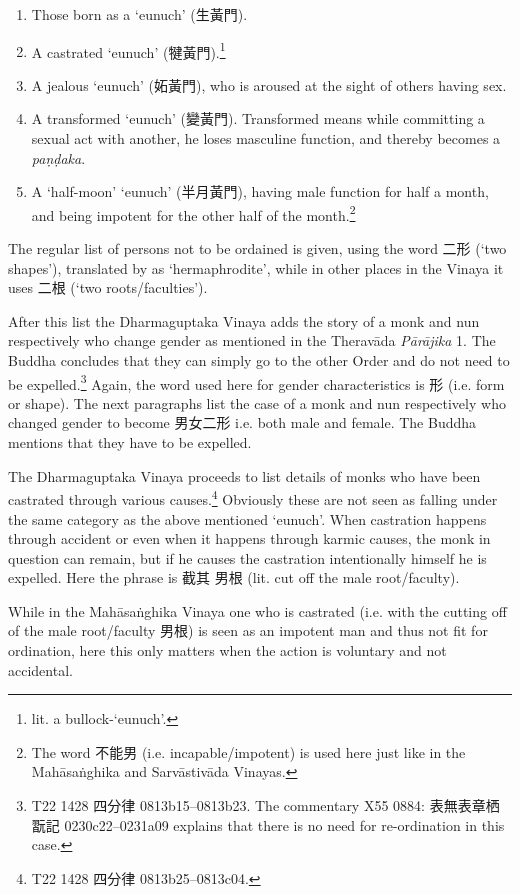 \begin{enumerate}
\item Those born as a `eunuch' (生黃門). 
\item A castrated `eunuch' (犍黃門).\footnote{lit. a bullock-`eunuch'.}
\item A jealous `eunuch' (妬黃門), who is aroused at the sight of others having sex.
\item A transformed `eunuch' (變黃門). Transformed means while committing a sexual act with another, he loses masculine function, and thereby becomes a {\em paṇḍaka}.
\item A `half-moon' `eunuch' (半月黃門), having male function for half a month, and being impotent for the other half of the month.\footnote{The word 不能男 (i.e. incapable/impotent) is used here just like in the Mahāsaṅghika and Sarvāstivāda Vinayas.}
\end{enumerate}

The regular list of persons not to be ordained is given, using the word 二形 (`two shapes'), translated by \cite{bodhi} as `hermaphrodite', while in other places in the Vinaya it uses 二根 (`two roots/faculties'). 

After this list the Dharmaguptaka Vinaya adds the story of a monk and nun respectively who change gender as mentioned in the Theravāda {\em Pārājika} 1. The Buddha concludes that they can simply go to the other Order and do not need to be expelled.\footnote{T22 1428 四分律 0813b15–0813b23. The commentary X55 0884: 表無表章栖翫記 0230c22–0231a09 explains that there is no need for re-ordination in this case.} Again, the word used here for gender characteristics is 形 (i.e. form or shape). The next paragraphs list the case of a monk and nun respectively who changed gender to become 男女二形 i.e. both male and female. The Buddha mentions that they have to be expelled.

The Dharmaguptaka Vinaya proceeds to list details of monks who have been castrated through various causes.\footnote{T22 1428 四分律 0813b25–0813c04.} Obviously these are not seen as falling under the same category as the above mentioned `eunuch'. When castration happens through accident or even when it happens through karmic causes, the monk in question can remain, but if he causes the castration intentionally himself he is expelled. Here the phrase is 截其 男根 (lit. cut off the male root/faculty).

While in the Mahāsaṅghika Vinaya one who is castrated (i.e. with the cutting off of the male root/faculty 男根) is seen as an impotent man and thus not fit for ordination, here this only matters when the action is voluntary and not accidental.

